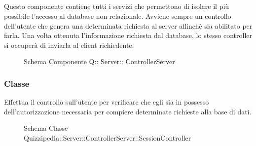\subsection{}
Questo componente contiene tutti i servizi che permettono di isolare il più possibile l'accesso al database non relazionale. Avviene sempre un controllo dell'utente che genera una determinata richiesta al server affinchè sia abilitato per farla. 
Una volta ottenuta l'informazione richiesta dal database, lo stesso controller si occuperà di inviarla al client richiedente.
\begin{figure}[H]
\centering
\noindent{}
\caption[Schema Componente Quizzipedia::Server::ControllerServer]{Schema Componente Q:: Server:: ControllerServer}
\end{figure}
\subsubsection{Classe }
Effettua il controllo sull'utente per verificare che egli sia in possesso dell'autorizzazione necessaria per compiere determinate richieste alla base di dati.
\begin{figure}[H]
\centering
\noindent{}
\caption[Schema Classe SessionController]{Schema Classe Quizzipedia::Server::ControllerServer::SessionController}
\end{figure}
